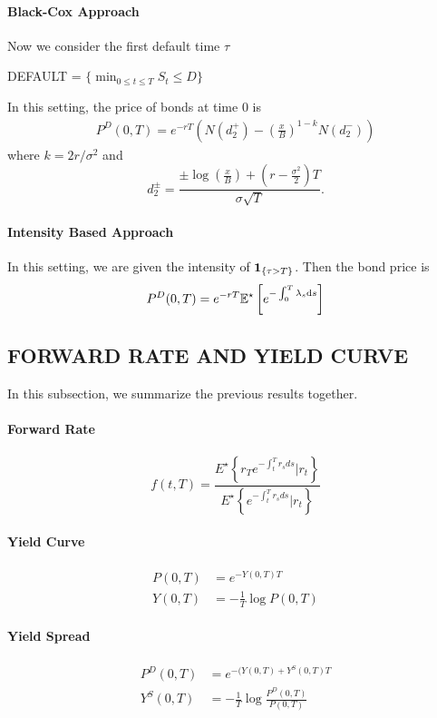 \paragraph{Black-Cox Approach} Now we consider the first default time $\tau$
\begin{center}
	DEFAULT = $\{ \min_{0\leq t \leq T} S_t \leq D \}$
\end{center}
In this setting, the price of bonds at time $0$ is 
\begin{align*}
	P^D ( 0 , T ) = e ^ { - r T } \left( N \left( d _ { 2 } ^ { + } \right) - \left( \frac { x } { B } \right) ^ { 1 - k } N \left( d _ { 2 } ^ { - } \right) \right)
\end{align*}
where $k =2r/\sigma^2$ and 
$$d _ { 2 } ^ { \pm } = \frac { \pm \log \left( \frac { x } { B } \right) + \left( r - \frac { \sigma ^ { 2 } } { 2 } \right) T } { \sigma \sqrt { T } }.$$

\paragraph{Intensity Based Approach}
In this setting, we are given the intensity of $\boldsymbol{1}_{\{ \tau > T \}}$. Then the bond price is
\begin{align*}
	P^D (0, T) = e^{-rT} \mathbb{E}^\star\left[  e^{-\int^T_0 \lambda_s \mathrm{d} s} \right]
\end{align*}

\subsection*{FORWARD RATE AND YIELD CURVE}
In this subsection, we summarize the previous results together.  
\paragraph{Forward Rate}
$$f(t, T)=\frac{E^{\star}\left\{r_{T} e^{-\int_{t}^{T} r_{s} d s} | r_{t}\right\}}{E^{\star}\left\{e^{-\int_{t}^{T} r_{s} d s} | r_{t}\right\}}$$

\paragraph{Yield Curve} 
\begin{align*}
P(0,T) &= e^{ -Y(0,T) T }\\
Y(0,T) &= -\frac{1}{T} \log P(0,T)
\end{align*}

\paragraph{Yield Spread} 
\begin{align*}
P^D(0,T) &= e^{ -(Y(0,T)+ Y^S(0,T) T }\\
Y^S(0,T) &= -\frac{1}{T} \log \frac{P^D(0,T)}{P(0,T)}
\end{align*}

